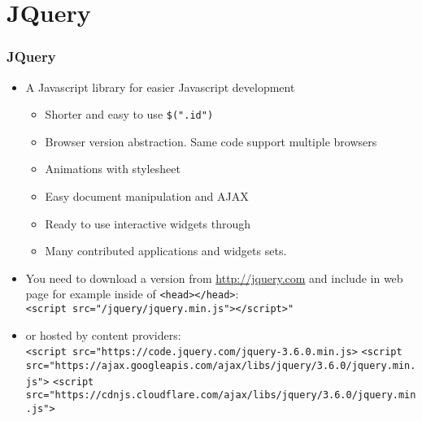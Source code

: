 \documentclass[trans,compress,xcolor=table]{beamer}
\begin{document}
\section{JQuery}
\begin{frame}
\frametitle{JQuery}
\begin{itemize}
\item A Javascript library for easier Javascript development
\begin{itemize}
\item Shorter and easy to use  \lstinline!$(".id")!
\item Browser version abstraction. Same code support multiple browsers
\item Animations with stylesheet
\item Easy document manipulation and AJAX
\item Ready to use interactive widgets through  
\item Many contributed applications and widgets sets.
\end{itemize}
\item You need to download a version from \url{http://jquery.com} and
	include in web page for example inside of \lstinline!<head></head>!:\\
	\lstinline!<script src="/jquery/jquery.min.js"></script>"!
\item or hosted by content providers:\\
	\lstinline[basicstyle=\tiny\ttfamily]!<script src="https://code.jquery.com/jquery-3.6.0.min.js>!
	\lstinline[basicstyle=\tiny\ttfamily]!<script src="https://ajax.googleapis.com/ajax/libs/jquery/3.6.0/jquery.min.js">!
	\lstinline[basicstyle=\tiny\ttfamily]!<script src="https://cdnjs.cloudflare.com/ajax/libs/jquery/3.6.0/jquery.min.js">!
\end{itemize}
\end{frame}
\end{document}

